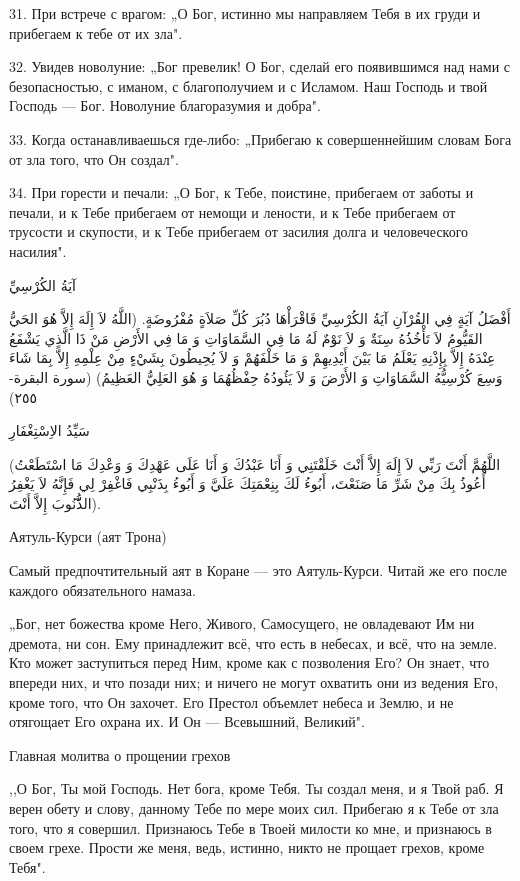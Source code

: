 \documentclass[a5paper]{article}
\begin{document}
31. При встрече с врагом: „О Бог, истинно мы направляем Тебя в их груди и прибегаем к тебе от их зла".

32. Увидев новолуние: „Бог превелик! О Бог, сделай его появившимся над нами с безопасностью, с иманом, с благополучием и с Исламом. Наш Господь и твой Господь — Бог. Новолуние благоразумия и добра".

33. Когда останавливаешься где-либо: „Прибегаю к совершеннейшим словам Бога от зла того, что Он создал".

34. При горести и печали: „О Бог, к Тебе, поистине, прибегаем от заботы и печали, и к Тебе прибегаем от немощи и лености, и к Тебе прибегаем от трусости и скупости, и к Тебе прибегаем от засилия долга и человеческого насилия".

آيَةُ الكُرْسِيِّ

أَفْضَلُ آيَةٍ فِي القُرْآنِ آيَةُ الكُرْسِيِّ فَاقْرَأْهَا دُبُرَ كُلِّ صَلاَةٍ مُفْرُوضَةٍ. (اللَّهُ لاَ إِلَهَ إِلاَّ هُوَ الحَيُّ القَيُّومُ لاَ تَأْخُذُهُ سِنَةٌ وَ لاَ نَوْمٌ لَهُ مَا فِي السَّمَاوَاتِ وَ مَا فِي الأَرْضِ مَنْ ذَا الَّذِي يَشْفَعُ عِنْدَهُ إِلاَّ بِإِذْنِهِ يَعْلَمُ مَا بَيْنَ أَيْدِيهِمْ وَ مَا خَلْفَهُمْ وَ لاَ يُحِيطُونَ بِشَيْءٍ مِنْ عِلْمِهِ إِلاَّ بِمَا شَاءَ وَسِعَ كُرْسِيُّهُ السَّمَاوَاتِ وَ الأَرْضَ وَ لاَ يَئُودُهُ حِفْظُهُمَا وَ هُوَ العَلِيُّ العَظِيمُ) (سورة البقرة- ٢٥٥)

سَيِّدُ الاِسْتِغْفَارِ

(اللَّهُمَّ أَنْتَ رَبِّي لاَ إِلَهَ إِلاَّ أَنْتَ خَلَقْتَنِي وَ أَنَا عَبْدُكَ وَ أَنَا عَلَى عَهْدِكَ وَ وَعْدِكَ مَا اسْتَطَعْتُ أَعُوذُ بِكَ مِنْ شَرِّ مَا صَنَعْتَ، أَبُوءُ لَكَ بِنِعْمَتِكَ عَلَيَّ وَ أَبُوءُ بِذَنْبِي فَاغْفِرْ لِي فَإِنَّهُ لاَ يَغْفِرُ الذُّّنُوبَ إِلاَّ أَنْتَ).

Аятуль-Курси (аят Трона)

Самый предпочтительный аят в Коране — это Аятуль-Курси. Читай же его после каждого обязательного намаза.

„Бог, нет божества кроме Него, Живого, Самосущего, не овладевают Им ни дремота, ни сон. Ему принадлежит всё, что есть в небесах, и всё, что на земле. Кто может заступиться перед Ним, кроме как с позволения Его? Он знает, что впереди них, и что позади них; и ничего не могут охватить они из ведения Его, кроме того, что Он захочет. Его Престол объемлет небеса и Землю, и не отягощает Его охрана их. И Он — Всевышний, Великий".

Главная молитва о прощении грехов

,,О Бог, Ты мой Господь. Нет бога, кроме Тебя. Ты создал меня, и я Твой раб. Я верен обету и слову, данному Тебе по мере моих сил. Прибегаю я к Тебе от зла того, что я совершил. Признаюсь Тебе в Твоей милости ко мне, и признаюсь в своем грехе. Прости же меня, ведь, истинно, никто не прощает грехов, кроме Тебя".
\end{document}
